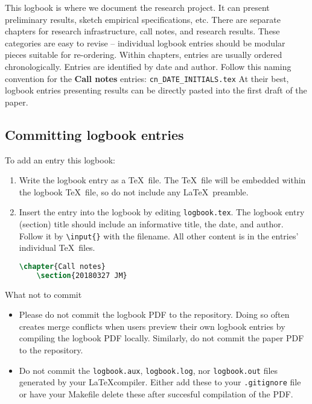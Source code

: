 
This logbook is where we document the research project.
It can present preliminary results, sketch empirical specifications, etc.
There are separate chapters for research infrastructure, call notes, and research results.
These categories are easy to revise -- individual logbook entries should be modular pieces suitable for re-ordering.
Within chapters, entries are usually ordered chronologically. Entries are identified by date and author.
Follow this naming convention for the \textbf{Call notes} entries: \texttt{cn\_DATE\_INITIALS.tex}
At their best, logbook entries presenting results can be directly pasted into the first draft of the paper.

\subsection{Committing logbook entries}

To add an entry this logbook:
\begin{enumerate}
	\item Write the logbook entry as a \TeX\ file. The \TeX\ file will be embedded within the logbook \TeX\ file, so do not include any \LaTeX\ preamble.
	\item Insert the entry into the logbook by editing \texttt{logbook.tex}.
	The logbook entry (section) title should include an informative title, the date, and author. 
	Follow it by \texttt{\textbackslash input\{\}} with the filename.
	All other content is in the entries' individual \TeX\ files.
	\begin{lstlisting}[language=tex]
	\chapter{Call notes}
	\section{20180327 JM} 
	\end{lstlisting}
\end{enumerate}

What not to commit 
\begin{itemize}
	\item Please do not commit the logbook PDF to the repository. 
	Doing so often creates merge conflicts when users preview their own logbook entries by compiling the logbook PDF locally.
	Similarly, do not commit the paper PDF to the repository.
	\item Do not commit the \texttt{logbook.aux}, \texttt{logbook.log}, nor \texttt{logbook.out} files generated by your \LaTeX compiler.
	Either add these to your \texttt{.gitignore} file or have your Makefile delete these after succesful compilation of the PDF.
\end{itemize}
